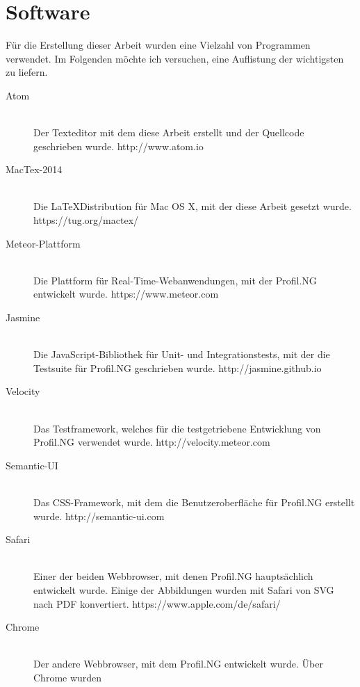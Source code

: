 

\chapter*{Software} %

Für die Erstellung dieser Arbeit wurden eine Vielzahl von Programmen verwendet.
Im Folgenden möchte ich versuchen, eine Auflistung der wichtigsten zu liefern.

\thispagestyle{empty}

\begin{description}
  \item[Atom] \hfill \\
  Der Texteditor mit dem diese Arbeit erstellt und der Quellcode geschrieben
  wurde. http://www.atom.io
  \item[MacTex-2014] \hfill \\
  Die \LaTeX\-Distribution für Mac OS X, mit der diese Arbeit gesetzt wurde.
  https://tug.org/mactex/
  \item[Meteor-Plattform] \hfill \\
  Die Plattform für Real-Time-Webanwendungen, mit der Profil.NG entwickelt
  wurde. https://www.meteor.com
  \item[Jasmine] \hfill \\
  Die JavaScript-Bibliothek für Unit- und Integrationstests, mit der die
  Testsuite für Profil.NG geschrieben wurde. http://jasmine.github.io
  \item[Velocity] \hfill \\
  Das Testframework, welches für die testgetriebene Entwicklung von Profil.NG
  verwendet wurde. http://velocity.meteor.com
  \item[Semantic-UI] \hfill \\
  Das CSS-Framework, mit dem die Benutzeroberfläche für Profil.NG erstellt
  wurde. http://semantic-ui.com
  \item[Safari] \hfill \\
  Einer der beiden Webbrowser, mit denen Profil.NG hauptsächlich entwickelt
  wurde. Einige der Abbildungen wurden mit Safari von SVG nach PDF konvertiert.
  https://www.apple.com/de/safari/
  \item[Chrome] \hfill \\
  Der andere Webbrowser, mit dem Profil.NG entwickelt wurde. Über Chrome wurden

\end{description}
